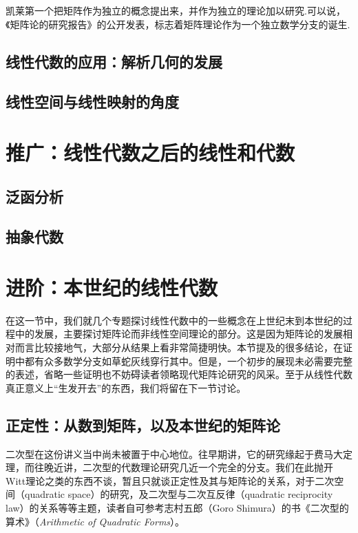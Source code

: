 凯莱第一个把矩阵作为独立的概念提出来，并作为独立的理论加以研究.可以说，《矩阵论的研究报告》的公开发表，标志着矩阵理论作为一个独立数学分支的诞生.

\subsection{线性代数的应用：解析几何的发展}


\subsection{线性空间与线性映射的角度}

\section{推广：线性代数之后的线性和代数}
\subsection{泛函分析}


\subsection{抽象代数}


\section{进阶：本世纪的线性代数}

在这一节中，我们就几个专题探讨线性代数中的一些概念在上世纪末到本世纪的过程中的发展，主要探讨矩阵论而非线性空间理论的部分。这是因为矩阵论的发展相对而言比较接地气，大部分从结果上看非常简捷明快。本节提及的很多结论，在证明中都有众多数学分支如草蛇灰线穿行其中。但是，一个初步的展现未必需要完整的表述，省略一些证明也不妨碍读者领略现代矩阵论研究的风采。至于从线性代数真正意义上“生发开去”的东西，我们将留在下一节讨论。

\subsection{正定性：从数到矩阵，以及本世纪的矩阵论}

二次型在这份讲义当中尚未被置于中心地位。往早期讲，它的研究缘起于费马大定理，而往晚近讲，二次型的代数理论研究几近一个完全的分支。我们在此抛开Witt理论之类的东西不谈，暂且只就谈正定性及其与矩阵论的关系，对于二次空间（quadratic space）的研究，及二次型与二次互反律（quadratic reciprocity law）的关系等等主题，读者自可参考志村五郎（Goro Shimura）的书《二次型的算术》（\textit{Arithmetic of Quadratic Forms}）。

